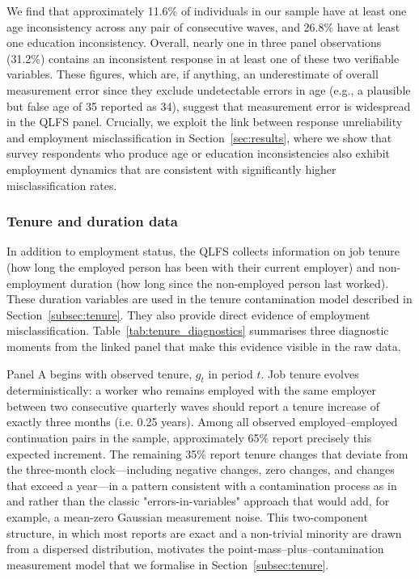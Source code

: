 We find that approximately 11.6\% of individuals in our sample have at least one
age inconsistency across any pair of consecutive waves, and 26.8\% have at least
one education inconsistency. Overall, nearly one in three panel observations
(31.2\%) contains an inconsistent response in at least one of these two verifiable
variables. These figures, which are, if anything, an underestimate of overall
measurement error since they exclude undetectable errors in age (e.g., a plausible
but false age of 35 reported as 34), suggest that measurement error is widespread
in the QLFS panel. Crucially, we exploit the link between response unreliability
and employment misclassification in Section~\ref{sec:results}, where we show that
survey respondents who produce age or education inconsistencies also exhibit
employment dynamics that are consistent with significantly higher misclassification
rates.

\subsubsection{Tenure and duration data}\label{sec:data:tenure}

In addition to employment status, the QLFS collects information on job tenure
(how long the employed person has been with their current employer) and
non-employment duration (how long since the non-employed person last worked).
These duration variables are used in the tenure contamination model described
in Section~\ref{subsec:tenure}. They also provide direct
evidence of employment misclassification. Table~\ref{tab:tenure_diagnostics}
summarises three diagnostic moments from the linked panel that make this
evidence visible in the raw data.

Panel A begins with observed tenure, $g_t$ in period $t$. Job tenure evolves
deterministically: a worker who remains employed with the
same employer between two consecutive quarterly waves should report a tenure
increase of exactly three months (i.e. 0.25 years). Among all observed employed--employed
continuation pairs in the sample, approximately 65\% report precisely this
expected increment. The remaining 35\% report tenure changes that deviate from
the three-month clock---including negative changes, zero changes, and changes
that exceed a year---in a pattern consistent with a contamination process as in 
\citet{goldstein1982contamination} and \citet{horowitz1995identification}
rather than the classic "errors-in-variables" approach that 
would add, for example, a mean-zero Gaussian measurement noise. 
This two-component structure, in which
most reports are exact and a non-trivial minority are drawn from a dispersed
distribution, motivates the point-mass--plus--contamination measurement model
that we formalise in Section~\ref{subsec:tenure}.

